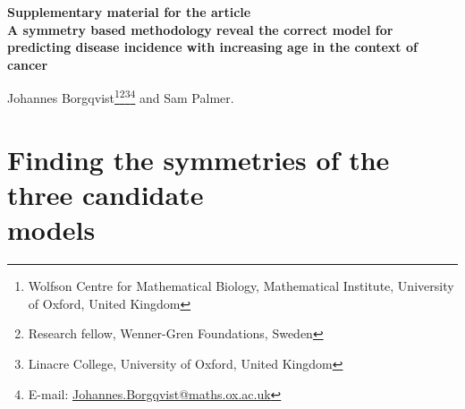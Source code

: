 \documentclass[12pt]{article}
\begin{document}
\begin{titlepage}
  \Large \textbf{Supplementary material for the article}\\[1cm]
  \Huge \textbf{A symmetry based methodology reveal the correct model for predicting disease incidence with increasing age in the context of cancer}\\[1cm]\normalsize

 \vspace{3.0cm}
        \setcounter{footnote}{1}
       Johannes Borgqvist\footnote{\label{Oxford}Wolfson Centre for Mathematical Biology, Mathematical Institute, University of Oxford, United Kingdom}\footnote{\label{WennerGren} Research fellow, Wenner-Gren Foundations, Sweden}\footnote{\label{Linacre} Linacre College, University of Oxford, United Kingdom}\footnote{E-mail: \url{Johannes.Borgqvist@maths.ox.ac.uk}} and Sam Palmer.

  
  
\end{titlepage}

\tableofcontents
\listoffigures
\listoftables
\newpage


\section{Finding the symmetries of the three candidate\\models}




\newpage
 


\end{document}
